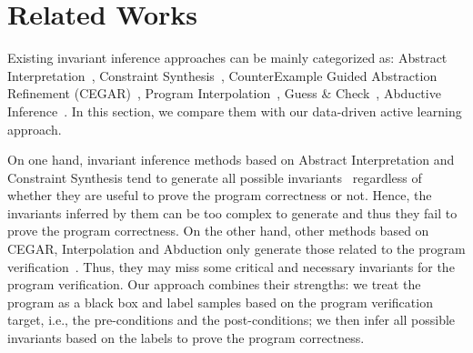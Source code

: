 
\section{Related Works} %
\label{sec:related}


Existing invariant inference approaches can be mainly categorized as: 
Abstract Interpretation~\cite{cousot1978automatic,mine2006octagon,cousot1979systematic,karr1976affine,vincent2009subpolyhedra}, 
Constraint Synthesis~\cite{ashutosh2009invgen,michael2003linear,sumit2009constraint}, 
CounterExample Guided Abstraction Refinement (CEGAR)~\cite{henzinger2003software,thomas2001slam,edmund2003counterexample}, 
Program Interpolation~\cite{kenneth2010lazy,thomas2004abstractions,kenneth2003interpolation,Kenneth2006lazy}, 
Guess \& Check~\cite{cormac2001houdini,ernst2007daikon}, 
Abductive Inference~\cite{isil2013inductive}. 
In this section, we compare them with our data-driven active learning approach. 

On one hand, invariant inference methods based on Abstract Interpretation and Constraint Synthesis 
tend to generate all possible invariants~\cite{mine2006octagon,vincent2009subpolyhedra,ashutosh2009invgen} regardless of 
whether they are useful to prove the program correctness or not. 
Hence, the invariants inferred by them can be too complex to generate 
and thus they fail to prove the program correctness. 
On the other hand, other methods based on CEGAR, Interpolation and Abduction 
only generate those related to the program verification~\cite{isil2013inductive}. 
Thus, they may miss some critical and necessary invariants for the program verification. 
Our approach combines their strengths: 
we treat the program as a black box 
and label samples based on the program verification target, 
i.e., the pre-conditions and the post-conditions; 
we then infer all possible invariants based on the labels 
to prove the program correctness. 

